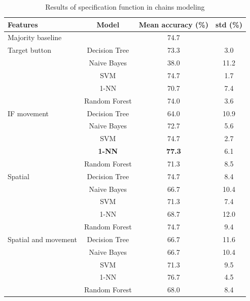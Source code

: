\begin{table}[!htbp]
 \centering
\begin{tabular}{lccc}
\toprule
Features & Model    & Mean accuracy (\%) & std (\%) \\
\midrule
 Majority baseline &   & 74.7	& \\
\midrule
Target button 	& Decision Tree 	& 73.3		& 3.0 	\\
				& Naive Bayes  	& 38.0		& 11.2	\\
				& SVM 			& 74.7		& 1.7	\\
				& 1-NN			& 70.7		& 7.4 	\\
				& Random Forest	& 74.0		& 3.6	\\
\midrule
IF movement	& Decision Tree 	& 	64.0	& 10.9 \\
			& Naive Bayes  	&	72.7	& 5.6	\\
			& SVM 			&	74.7	& 2.7 	\\
			& \textbf{1-NN}	&	\textbf{77.3	} & 6.1 	\\
			& Random Forest	&	71.3	& 8.5 	\\
		
\midrule
Spatial	 	& Decision Tree 	& 74.7	& 8.4 \\
			& Naive Bayes  	& 66.7 	& 10.4	\\
			& SVM 			& 71.3	& 7.4 	\\
			& 1-NN			& 68.7	& 12.0 \\
			& Random Forest	& 74.7	& 9.4 \\	
\midrule
Spatial and movement& Decision Tree 	& 66.7	& 11.6 \\
					& Naive Bayes  	& 66.7	& 10.4	\\
					& SVM 			& 71.3	& 9.5 	\\
					& 1-NN			& 76.7	& 4.5 \\
					& Random Forest	& 68.0	& 8.4 \\			
\bottomrule
\end{tabular}
\caption{Results of specification function in chains modeling}
\label{tab:chains-ml-specification}
\end{table}

